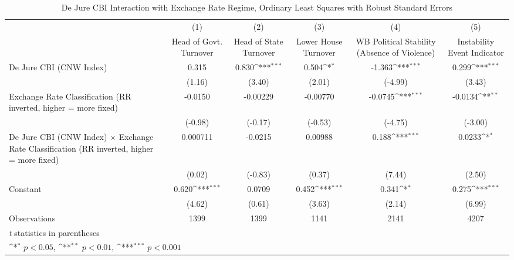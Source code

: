 \begin{table}[htbp]\centering
\def\sym#1{\ifmmode^{#1}\else\(^{#1}\)\fi}
\caption{De Jure CBI Interaction with Exchange Rate Regime, Ordinary Least Squares with Robust Standard Errors \label{imultIndOLSDJ}}
\begin{tabular*}{\linewidth}{@{\hskip\tabcolsep\extracolsep\fill}l*{5}{c}}
\hline\hline
                &\multicolumn{1}{c}{(1)}&\multicolumn{1}{c}{(2)}&\multicolumn{1}{c}{(3)}&\multicolumn{1}{c}{(4)}&\multicolumn{1}{c}{(5)}\\
                &\multicolumn{1}{c}{Head of Govt. Turnover}&\multicolumn{1}{c}{Head of State Turnover}&\multicolumn{1}{c}{Lower House Turnover}&\multicolumn{1}{c}{WB Political Stability (Absence of Violence)}&\multicolumn{1}{c}{Instability Event Indicator}\\
\hline
De Jure CBI (CNW Index)&    0.315         &    0.830\sym{***}&    0.504\sym{*}  &   -1.363\sym{***}&    0.299\sym{***}\\
                &   (1.16)         &   (3.40)         &   (2.01)         &  (-4.99)         &   (3.43)         \\
[1em]
Exchange Rate Classification (RR inverted, higher = more fixed)&  -0.0150         & -0.00229         & -0.00770         &  -0.0745\sym{***}&  -0.0134\sym{**} \\
                &  (-0.98)         &  (-0.17)         &  (-0.53)         &  (-4.75)         &  (-3.00)         \\
[1em]
De Jure CBI (CNW Index) $\times$ Exchange Rate Classification (RR inverted, higher = more fixed)& 0.000711         &  -0.0215         &  0.00988         &    0.188\sym{***}&   0.0233\sym{*}  \\
                &   (0.02)         &  (-0.83)         &   (0.37)         &   (7.44)         &   (2.50)         \\
[1em]
Constant        &    0.620\sym{***}&   0.0709         &    0.452\sym{***}&    0.341\sym{*}  &    0.275\sym{***}\\
                &   (4.62)         &   (0.61)         &   (3.63)         &   (2.14)         &   (6.99)         \\
\hline
Observations    &     1399         &     1399         &     1141         &     2141         &     4207         \\
\hline\hline
\multicolumn{6}{l}{\footnotesize \textit{t} statistics in parentheses}\\
\multicolumn{6}{l}{\footnotesize \sym{*} \(p<0.05\), \sym{**} \(p<0.01\), \sym{***} \(p<0.001\)}\\
\end{tabular*}
\end{table}
